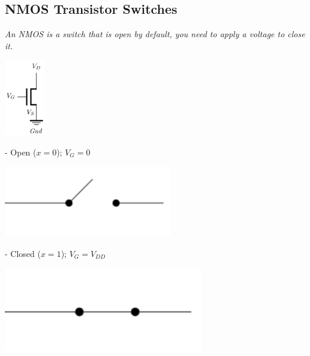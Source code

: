 \documentclass[12pt,openany]{book}
\begin{document}
					\subsection{NMOS Transistor Switches}
			      	\textit{An NMOS is a switch that is open by default, you need to apply a voltage to close it.}
						\begin{center}
			      			\includegraphics[width=0.13\textwidth]{circuits/9.1.1.png} 
						\end{center}
			      		\begin{minipage}{0.45\textwidth}
						- Open ($x=0$); $V_{G} = 0$
							\begin{center}
							\includegraphics[width=0.55\textwidth]{circuits/9.1.1_4.png}
						\end{center}
						\vspace*{20px}
						- Closed ($x=1$); $V_{G} = V_{DD}$
						\begin{center}
							\includegraphics[width=0.65\textwidth]{circuits/9.1.1_5.png}
						\end{center}
			      		\end{minipage}%
						\hfill
						\vline
						\hfill
\end{document}
